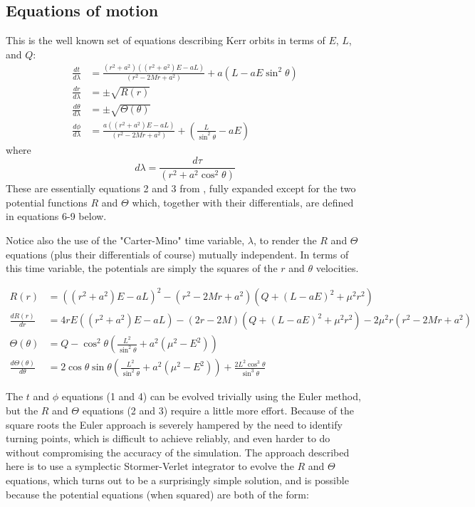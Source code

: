 \documentclass[11pt]{article}
\begin{document}
\subsection {Equations of motion}

This is the well known set of equations describing Kerr orbits in terms of $E$, $L$, and $Q$:
\begin{align}
\frac{d t}{d \lambda} &= \frac{(r^2 + a^2) \left((r^2 + a^2) E - aL \right)} {(r^2 - 2Mr  + a^2)} + a(L - aE \sin^2 \theta) \\
\frac{d r}{d \lambda} &= \pm \sqrt {R(r)} \\
\frac{d \theta}{d \lambda} &= \pm \sqrt {\Theta (\theta)} \\
\frac{d \phi}{d \lambda} &= \frac{a \left((r^2 + a^2) E - aL \right)} {(r^2 - 2Mr  + a^2)} + \left(\frac {L} {\sin^2 \theta} -aE \right)
\end{align}
where
\begin{equation}
d \lambda = \frac {d \tau} {(r^2 + a^2 \cos^2\theta)}
\end{equation}
These are essentially equations 2 and 3 from \cite{wilkins}, fully expanded except for the two potential functions $R$ and $\Theta$ which, together with their differentials, are defined in equations 6-9 below.

Notice also the use of the "Carter-Mino" time variable, $\lambda$, to render the $R$ and $\Theta$ equations (plus their differentials of course) mutually independent.  In terms of this time variable, the potentials are simply the squares of the $r$ and $\theta$ velocities.

\begin{align}
R(r) &= \left((r^2 + a^2) E - aL \right)^2 - (r^2 - 2Mr  + a^2) \left(Q + ( L - aE)^2 + \mu^2 r^2 \right) \\
\frac{d R(r)}{d r} &= 4rE \left((r^2 + a^2)E - aL \right) - (2r - 2M) \left(Q + ( L - aE)^2 + \mu^2 r^2 \right) - 2\mu^2r(r^2 - 2Mr  + a^2) \\
\Theta (\theta) &= Q - {\cos^2 \theta } \left( \frac{L^2}{\sin^2 \theta } + a^2( \mu^2 - E^2) \right) \\
\frac{d \Theta (\theta)}{d \theta} &= 2 \cos \theta \sin \theta \left(\frac{L^2} {\sin^2 \theta } + a^2(\mu^2 - E^2) \right) +\frac{2 L^2 \cos^3 \theta } {\sin^3 \theta }
\end{align}

The $t$ and $\phi$ equations (1 and 4) can be evolved trivially using the Euler method, but the $R$ and $\Theta$ equations (2 and 3) require a little more effort.  Because of the square roots the Euler approach is severely hampered by the need to identify turning points, which is difficult to achieve reliably, and even harder to do without compromising the accuracy of the simulation.  The approach described here is to use a symplectic Stormer-Verlet integrator \cite{hairer} to evolve the $R$ and $\Theta$ equations, which turns out to be a surprisingly simple solution, and is possible because the potential equations (when squared) are both of the form:
\end{document}
